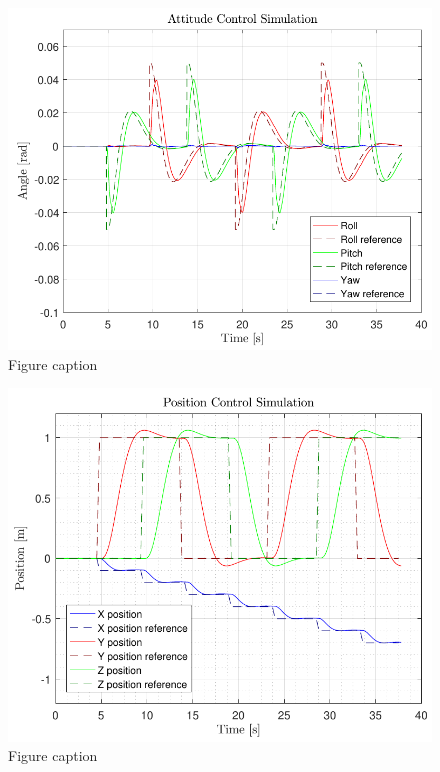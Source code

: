 \begin{minipage}{\linewidth}
	\begin{minipage}{0.45\linewidth}
		\begin{figure}
			\includegraphics[width=1\linewidth]{figures/AttitudeControl}
			\caption{Figure caption}
		\end{figure}
	\end{minipage}
	\hspace{0.03\linewidth}
	\begin{minipage}{0.45\linewidth}
		\begin{figure}
			\includegraphics[width=1\linewidth]{figures/PositionControl}
			\caption{Figure caption}
		\end{figure}
	\end{minipage}
\end{minipage}